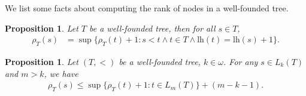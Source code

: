 \documentclass[11pt]{amsart}
\newtheorem{proposition}[theorem]{Proposition}
\theoremstyle{definition}
\theoremstyle{remark}
\numberwithin{equation}{section}
\def\lh{{\mathrm{lh}}}
\begin{document}

We list some facts about computing the rank of nodes in a well-founded tree.


\begin{proposition}\label{tree}
Let $T$ be a well-founded tree, then for all $s\in T$,
\begin{align*}
    \rho_T(s)&=\sup\{\rho_T(t)+1:s<t\land t\in T\land\lh(t)=\lh(s)+1\}.
\end{align*}
\end{proposition}


\begin{proposition}\label{L_k(T)}
    Let $(T,<)$ be a well-founded tree, $k\in\omega$. For any $s\in L_k(T)$ and $m>k$, we have
        \begin{align*}
            \rho_T(s)\leq\sup\{\rho_T(t)+1:t\in L_m(T)\}+(m-k-1).
        \end{align*}
\end{proposition}
\end{document}
